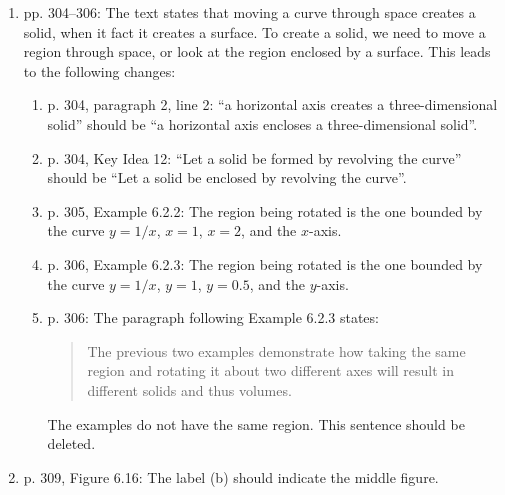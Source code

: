 \documentclass{amsart}
\begin{document}
\begin{enumerate}
\item pp. 304--306: The text states that moving a curve through space creates a solid, when it fact it creates a surface. To create a solid, we need to move a region through space, or look at the region enclosed by a surface. This leads to the following changes:
\begin{enumerate}
\item p. 304, paragraph 2, line 2: ``a horizontal axis creates a three-dimensional solid'' should be ``a horizontal axis encloses a three-dimensional solid''.
\item p. 304, Key Idea 12: ``Let a solid be formed by revolving the curve'' should be ``Let a solid be enclosed by revolving the curve''.
\item p. 305, Example 6.2.2: The region being rotated is the one bounded by the curve $y=1/x$, $x=1$, $x=2$, and the $x$-axis.
\item p. 306, Example 6.2.3: The region being rotated is the one bounded by the curve $y=1/x$, $y=1$, $y=0.5$, and the $y$-axis.
\item p. 306: The paragraph following Example 6.2.3 states:
\begin{quote}
The previous two examples demonstrate how taking the same region and rotating it about two different axes will result in different solids and thus volumes.
\end{quote}
The examples do not have the same region. This sentence should be deleted.
\end{enumerate}
\item p. 309, Figure 6.16: The label (b) should indicate the middle figure.
\label{2016-08-00Iplus}
\end{enumerate}
\end{document}
